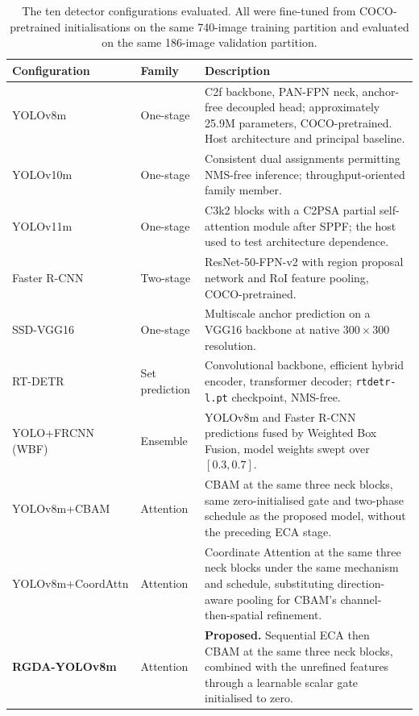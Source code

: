 \documentclass[MScCS]{uccthesis}
\begin{document}
\begin{table}[tbp]
\centering
\small
\setlength{\tabcolsep}{4pt}
\begin{tabularx}{\textwidth}{@{}>{\raggedright\arraybackslash}p{3.1cm}
                                >{\raggedright\arraybackslash}p{2.2cm} X@{}}
\toprule
\textbf{Configuration} & \textbf{Family} & \textbf{Description} \\
\midrule
YOLOv8m & One-stage & C2f backbone, PAN-FPN neck, anchor-free decoupled head;
   approximately 25.9M parameters, COCO-pretrained. Host architecture and
   principal baseline. \\
\addlinespace[8pt]
YOLOv10m & One-stage & Consistent dual assignments permitting NMS-free
   inference; throughput-oriented family member. \\
\addlinespace[8pt]
YOLOv11m & One-stage & C3k2 blocks with a C2PSA partial self-attention module
   after SPPF; the host used to test architecture dependence. \\
\addlinespace[8pt]
Faster R-CNN & Two-stage & ResNet-50-FPN-v2 with region proposal network and
   RoI feature pooling, COCO-pretrained. \\
\addlinespace[8pt]
SSD-VGG16 & One-stage & Multiscale anchor prediction on a VGG16 backbone at
   native $300 \times 300$ resolution. \\
\addlinespace[8pt]
RT-DETR & Set prediction & Convolutional backbone, efficient hybrid encoder,
   transformer decoder; \texttt{rtdetr-l.pt} checkpoint, NMS-free. \\
\addlinespace[8pt]
YOLO+FRCNN (WBF) & Ensemble & YOLOv8m and Faster R-CNN predictions fused by
   Weighted Box Fusion, model weights swept over $[0.3,0.7]$. \\
\addlinespace[8pt]
YOLOv8m+CBAM & Attention & CBAM at the same three neck blocks, same
   zero-initialised gate and two-phase schedule as the proposed model, without
   the preceding ECA stage. \\
\addlinespace[8pt]
YOLOv8m+CoordAttn & Attention & Coordinate Attention at the same three neck
   blocks under the same mechanism and schedule, substituting direction-aware
   pooling for CBAM's channel-then-spatial refinement. \\
\addlinespace[8pt]
\textbf{RGDA-YOLOv8m} & Attention & \textbf{Proposed.} Sequential ECA then CBAM
   at the same three neck blocks, combined with the unrefined features through
   a learnable scalar gate initialised to zero. \\
\bottomrule
\end{tabularx}
\caption[Configurations evaluated in the benchmark.]
        {\label{tab:baselines}The ten detector configurations evaluated. All
         were fine-tuned from COCO-pretrained initialisations on the same
         740-image training partition and evaluated on the same 186-image
         validation partition.}
\end{table}
\end{document}

